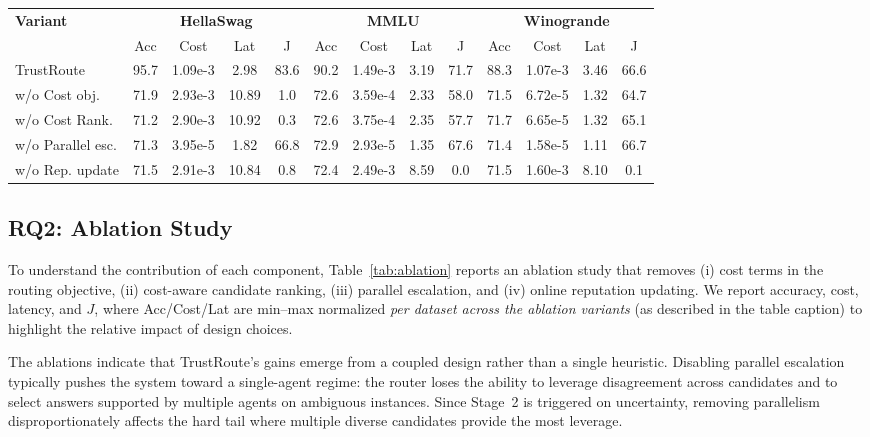 \documentclass[acmsmall,screen,review,anonymous]{acmart}
\begin{document}
\begin{table}[t]
\vspace{8pt}

\begin{tabular}{lcccc cccc cccc}
\toprule
\multirow{2}{*}{\textbf{Variant}} &
\multicolumn{4}{c}{\textbf{HellaSwag}} &
\multicolumn{4}{c}{\textbf{MMLU}} &
\multicolumn{4}{c}{\textbf{Winogrande}} \\
\cmidrule(lr){2-5}\cmidrule(lr){6-9}\cmidrule(lr){10-13}
& Acc & Cost & Lat & J & Acc & Cost & Lat & J & Acc & Cost & Lat & J \\
\midrule
TrustRoute             & 95.7 & 1.09e-3 & 2.98 & 83.6 & 90.2 & 1.49e-3 & 3.19 & 71.7 & 88.3 & 1.07e-3 & 3.46 & 66.6 \\
w/o Cost obj.          & 71.9 & 2.93e-3 & 10.89 & 1.0 & 72.6 & 3.59e-4 & 2.33 & 58.0 & 71.5 & 6.72e-5 & 1.32 & 64.7 \\
w/o Cost Rank.   & 71.2 & 2.90e-3 & 10.92 & 0.3 & 72.6 & 3.75e-4 & 2.35 & 57.7 & 71.7 & 6.65e-5 & 1.32 & 65.1 \\
w/o Parallel esc.      & 71.3 & 3.95e-5 & 1.82 & 66.8 & 72.9 & 2.93e-5 & 1.35 & 67.6 & 71.4 & 1.58e-5 & 1.11 & 66.7 \\
w/o Rep. update        & 71.5 & 2.91e-3 & 10.84 & 0.8 & 72.4 & 2.49e-3 & 8.59 & 0.0 & 71.5 & 1.60e-3 & 8.10 & 0.1 \\
\bottomrule
\end{tabular}
\end{table}

\subsection{RQ2: Ablation Study}
\label{sec:rq2}

To understand the contribution of each component, Table~\ref{tab:ablation} reports an ablation study that removes (i) cost terms in the routing objective, (ii) cost-aware candidate ranking, (iii) parallel escalation, and (iv) online reputation updating.
We report accuracy, cost, latency, and $J$, where Acc/Cost/Lat are min--max normalized \emph{per dataset across the ablation variants} (as described in the table caption) to highlight the relative impact of design choices.

The ablations indicate that TrustRoute's gains emerge from a coupled design rather than a single heuristic.
Disabling parallel escalation typically pushes the system toward a single-agent regime: the router loses the ability to leverage disagreement across candidates and to select answers supported by multiple agents on ambiguous instances.
Since Stage~2 is triggered on uncertainty, removing parallelism disproportionately affects the hard tail where multiple diverse candidates provide the most leverage.
\end{document}

